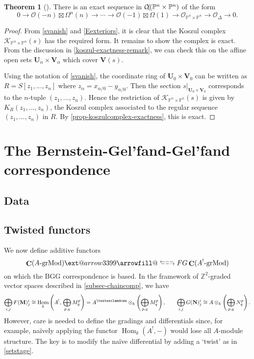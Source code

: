 \documentclass[a4paper]{article}
\makeatletter
\theoremstyle{definition}
\newtheorem{theorem}[defn]{Theorem}
\theoremstyle{remark}
\newcommand{\leftrarrows}{\mathrel{\raise.75ex\hbox{\oalign{%
  $\scriptstyle\leftarrow$\cr
  \vrule width0pt height.5ex$\hfil\scriptstyle\relbar$\cr}}}}
\newcommand{\lrightarrows}{\mathrel{\raise.75ex\hbox{\oalign{%
  $\scriptstyle\relbar$\hfil\cr
  $\scriptstyle\vrule width0pt height.5ex\smash\rightarrow$\cr}}}}
\newcommand{\Rrelbar}{\mathrel{\raise.75ex\hbox{\oalign{%
  $\scriptstyle\relbar$\cr
  \vrule width0pt height.5ex$\scriptstyle\relbar$}}}}
\def\leftrightarrowsfill@{\arrowfill@\leftrarrows\Rrelbar\lrightarrows}
\newcommand{\xleftrightarrows}[2][]{\ext@arrow 3399\leftrightarrowsfill@{#1}{#2}}
\newcommand{\grMod}{\ensuremath{\text{-grMod}}}
\DeclareMathOperator{\Hom}{\text{Hom}}
\DeclareMathOperator{\Ch}{\mathbf{C}}
\newcommand{\Pn}{\ensuremath{{\mathbb{P}^n}}}
\DeclareMathOperator{\coh}{\mathcal{C\kern -2pt o\kern -2pt h\kern -1pt}}
\newcommand{\gnab}{{\textexclamdown}}
\makeatother
\begin{document}
\begin{theorem}[]
    There is an exact sequence in \(\coh(\Pn \times \Pn)\) of the form 
    \[0\rightarrow \mathscr{O}(-n)\boxtimes \Omega^n(n)
    \rightarrow \cdots \rightarrow \mathscr{O}(-1)\boxtimes 
    \Omega(1) \rightarrow \mathscr{O}_{\Pn\times \Pn} \rightarrow \mathscr{O}_\Delta
    \rightarrow 0.\]
    \begin{proof} 
        From \cref{svanish} and \cref{Eexteriors}, it is clear that the Koszul
        complex \(\mathscr{K}_{\Pn\times \Pn}(s)\) has the required form. It
        remains to show the complex is exact. From the discussion in
        \cref{koszul-exactness-remark}, we can check this on the affine open
        sets \(\mathbf{U}_\alpha \times \mathbf{V}_\alpha\) which cover
        \(\mathbf{V}(s)\). 

        Using the notation of \cref{svanish}, the coordinate ring of
        \(\mathbf{U}_0\times \mathbf{V}_0\) can be written as
        \(R=S[z_1,...,z_n]\) where \(z_\alpha = x_{\alpha/0}-y_{\alpha/0}\).
        Then the section \(s\big|_{\mathbf{U}_0\times \mathbf{V}_0}\)
        corresponds to the \(n\)-tuple \((z_1,...,z_n)\). Hence the restriction
        of \(\mathscr{K}_{\Pn\times\Pn}(s)\) is given by \(K_R(z_1,...,z_n)\),
        the Koszul complex associated to the regular sequence \((z_1,...,z_n)\)
        in \(R\). By \cref{prop-koszulcomplex-exactness}, this is exact.
    \end{proof}
\end{theorem}

\paragraph{}

\section{The Bernstein-Gel'fand-Gel'fand correspondence}\label{sec-BGG}


\subsection{Data}
\subsection{Twisted functors}

We now define additive functors 
\[\Ch(A\grMod) \xleftrightarrows[F]{G} \Ch(A^!\grMod)\]
on which the BGG correspondence is based. In the framework of
\(\mathbb{Z}^2\)-graded vector spaces described in \cref{subsec-chaincomp}, we have 
\[\bigoplus_{i,j}F(\mathbf{M})^i_j \cong \Hom_{k}\left(A^!,\,
\bigoplus_{p,q}M^p_q\right) = A^\gnab \otimes_k
\left(\bigoplus_{p,q}M^p_q\right), \qquad \bigoplus_{i,j}G(\mathbf{N})^i_j \cong
A\otimes_k \left(\bigoplus_{p,q}N^p_q\right).\] 
However, care is needed to define the gradings and differentials since, for
example, na\"ively applying the functor \(\Hom_k(A^!,-)\) would lose all
\(A\)-module structure. The key is to modify the na\"ive differential by adding a
`twist' as in \cref{setstage}.
\end{document}

